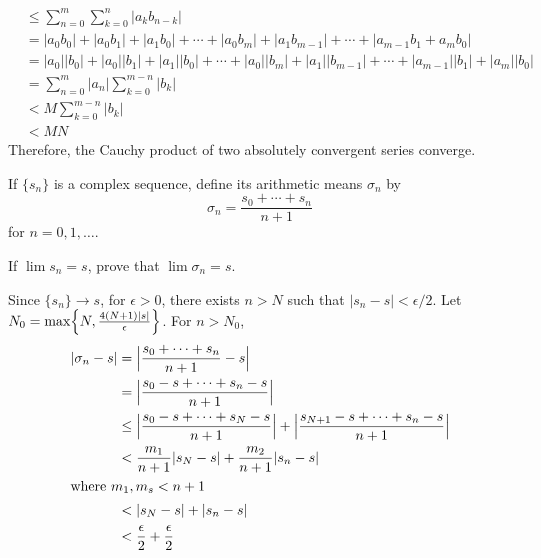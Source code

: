 \begin{exercise}
\begin{align*}
    & \leq \sum_{n = 0}^m\sum_{k = 0}^n\lvert a_kb_{n - k}\rvert\\
    & = \lvert a_0b_0\rvert + \lvert a_0b_1\rvert + \lvert a_1b_0\rvert +
      \cdots + \lvert a_0b_m\rvert + \lvert a_1b_{m - 1}\rvert + \cdots +
      \lvert a_{m - 1}b_1 + a_mb_0\rvert\\
    & = \lvert a_0\rvert\lvert b_0\rvert + \lvert a_0\rvert\lvert b_1\rvert +
      \lvert a_1\rvert\lvert b_0\rvert + \cdots + \lvert a_0\rvert
      \lvert b_m\rvert + \lvert a_1\rvert\lvert b_{m - 1}\rvert + \cdots +
      \lvert a_{m - 1}\rvert\lvert b_1\rvert + \lvert a_m\rvert
      \lvert b_0\rvert\\
    & = \sum_{n = 0}^m\lvert a_n\rvert\sum_{k = 0}^{m - n}\lvert b_k\rvert\\
    & < M\sum_{k = 0}^{m - n}\lvert b_k\rvert\\
    & < MN
  \end{align*}
  Therefore, the Cauchy product of two absolutely convergent series converge.
\item
  If \(\{s_n\}\) is a complex sequence, define its arithmetic means
  \(\sigma_n\) by
  \[
  \sigma_n = \frac{s_0 + \cdots + s_n}{n + 1}
  \]
  for \(n = 0,1,\ldots\).
  \begin{exercise}[label = (\alph*), ref = \arabic{exercisei} (\alph*)]
  \item
    \label{3.12.a}
    If \(\lim s_n = s\), prove that \(\lim\sigma_n = s\).
    \par\smallskip
    Since \(\{s_n\}\to s\), for \(\epsilon > 0\), there exists \(n > N\) such
    that \(\lvert s_n - s\rvert < \epsilon/2\).
    Let \(N_0 = \max\Bigl\{N,\frac{4(N + 1)\lvert s\rvert}{\epsilon}\Bigr\}\).
    For \(n > N_0\),
    \begin{align*}
      \lvert\sigma_n - s\rvert
      & = \Bigl\lvert\frac{s_0 + \cdots + s_n}{n + 1} - s\Bigr\rvert\\
      & = \Bigl\lvert\frac{s_0 - s + \cdots + s_n - s}{n + 1}\Bigr\rvert\\
      & \leq \Bigl\lvert\frac{s_0 - s + \cdots + s_N - s}{n + 1}\Bigr\rvert +
        \Bigl\lvert\frac{s_{N + 1} - s + \cdots + s_n - s}{n + 1}\Bigr\rvert\\
      & < \frac{m_1}{n + 1}\lvert s_N - s\rvert + \frac{m_2}{n + 1}
        \lvert s_n - s\rvert\\
      \intertext{where \(m_1,m_s < n + 1\)}
      & < \lvert s_N - s\rvert + \lvert s_n - s\rvert\\
      & < \frac{\epsilon}{2} + \frac{\epsilon}{2}\\

\end{align*}
\end{exercise}
\end{exercise}
